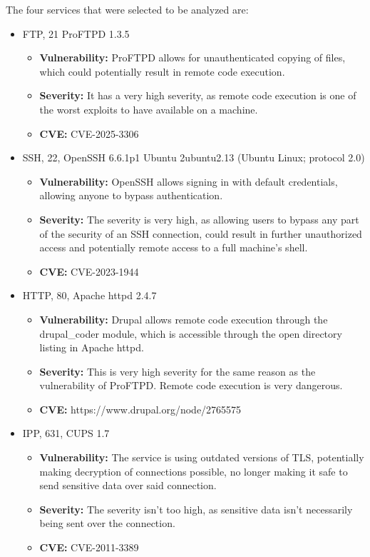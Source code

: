 The four services that were selected to be analyzed are:
\begin{itemize}
    \item FTP, 21 ProFTPD 1.3.5
          \begin{itemize}
              \item \textbf{Vulnerability:} ProFTPD allows for unauthenticated copying of files, which could potentially result in remote code execution.
              \item \textbf{Severity:} It has a very high severity, as remote code execution is one of the worst exploits to have available on a machine.
              \item \textbf{CVE:} CVE-2025-3306
          \end{itemize}
    \item SSH, 22, OpenSSH 6.6.1p1 Ubuntu 2ubuntu2.13 (Ubuntu Linux; protocol 2.0)
          \begin{itemize}
              \item \textbf{Vulnerability:} OpenSSH allows signing in with default credentials, allowing anyone to bypass authentication.
              \item \textbf{Severity:} The severity is very high, as allowing users to bypass any part of the security of an SSH connection, could result in further unauthorized access and potentially remote access to a full machine's shell.
              \item \textbf{CVE:} CVE-2023-1944
          \end{itemize}
    \item HTTP, 80, Apache httpd 2.4.7
          \begin{itemize}
              \item \textbf{Vulnerability:} Drupal allows remote code execution through the drupal\_coder module, which is accessible through the open directory listing in Apache httpd.
              \item \textbf{Severity:} This is very high severity for the same reason as the vulnerability of ProFTPD. Remote code execution is very dangerous.
              \item \textbf{CVE:} https://www.drupal.org/node/2765575
          \end{itemize}
    \item IPP, 631, CUPS 1.7
          \begin{itemize}
              \item \textbf{Vulnerability:} The service is using outdated versions of TLS, potentially making decryption of connections possible, no longer making it safe to send sensitive data over said connection.
              \item \textbf{Severity:} The severity isn't too high, as sensitive data isn't necessarily being sent over the connection.
              \item \textbf{CVE:} CVE-2011-3389
          \end{itemize}
\end{itemize}

